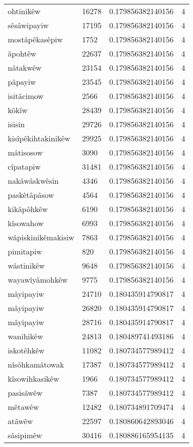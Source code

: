 \begin{longtable}{llll}
ohtinikêw & 16278 & 0.179856382140156 & 4 \\
sêsâwipayiw & 17195 & 0.179856382140156 & 4 \\
mostâpêkasêpiw & 1752 & 0.179856382140156 & 4 \\
âpohtêw & 22637 & 0.179856382140156 & 4 \\
nâtakwêw & 23154 & 0.179856382140156 & 4 \\
pâpayiw & 23545 & 0.179856382140156 & 4 \\
isitâcimow & 2566 & 0.179856382140156 & 4 \\
kôkîw & 28439 & 0.179856382140156 & 4 \\
isisin & 29726 & 0.179856382140156 & 4 \\
kisîpêkihtakinikêw & 29925 & 0.179856382140156 & 4 \\
mâtisosow & 3090 & 0.179856382140156 & 4 \\
cîpatapiw & 31481 & 0.179856382140156 & 4 \\
nakâwâskwêsin & 4346 & 0.179856382140156 & 4 \\
paskêtâpâsow & 4564 & 0.179856382140156 & 4 \\
kikâpôhkêw & 6190 & 0.179856382140156 & 4 \\
kîsowahow & 6993 & 0.179856382140156 & 4 \\
wâpiskinikêmakisiw & 7863 & 0.179856382140156 & 4 \\
pimitapiw & 820 & 0.179856382140156 & 4 \\
wâstinikêw & 9648 & 0.179856382140156 & 4 \\
wayawîyâmohkêw & 9775 & 0.179856382140156 & 4 \\
mâyipayiw & 24710 & 0.180435914790817 & 4 \\
mâyipayiw & 26820 & 0.180435914790817 & 4 \\
mâyipayiw & 28716 & 0.180435914790817 & 4 \\
wanihikêw & 24813 & 0.180489741493186 & 4 \\
iskotêhkêw & 11082 & 0.180734577989412 & 4 \\
nîsôhkamâtowak & 17387 & 0.180734577989412 & 4 \\
kîsowihkasikêw & 1966 & 0.180734577989412 & 4 \\
pasisâwêw & 7387 & 0.180734577989412 & 4 \\
mêtawêw & 12482 & 0.180734891709474 & 4 \\
atâwêw & 22597 & 0.180860642893046 & 4 \\
sâsipimêw & 30416 & 0.180886165954135 & 4 \\

\end{longtable}
